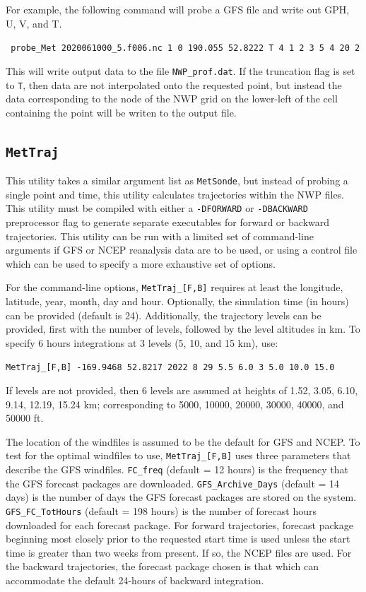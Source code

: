 \documentclass[11pt]{article}   %
\begin{document}
For example, the following command will probe a GFS file and write out
GPH, U, V, and T.

\verb| probe_Met 2020061000_5.f006.nc 1 0 190.055 52.8222 T 4 1 2 3 5 4 20 2 |

This will write output data to the file \texttt{NWP\_prof.dat}.
If the truncation flag is set to \texttt{T}, then data are not interpolated onto
the requested point, but instead the data corresponding to the node of the NWP
grid on the lower-left of the cell containing the point will be writen to the output file.

\subsection{\texttt{MetTraj}}

This utility takes a similar argument list as \texttt{MetSonde}, but instead of
probing a single point and time, this utility calculates trajectories within
the NWP files.
This utility must be compiled with either a \texttt{-DFORWARD} or \texttt{-DBACKWARD}
preprocessor flag to generate separate executables for forward or backward trajectories.
This utility can be run with a limited set of command-line arguments if GFS or NCEP
reanalysis data are to be used, or using a control file which can be used to specify
a more exhaustive set of options.

For the command-line options, \texttt{MetTraj\_[F,B]} requires at least the longitude,
latitude, year, month, day and hour.  Optionally, the simulation time (in hours) can
be provided (default is 24).  Additionally, the trajectory levels can be provided,
first with the number of
levels, followed by the level altitudes in km.  To specify 6 hours
integrations at 3 levels (5, 10, and 15 km), use:

\verb|MetTraj_[F,B] -169.9468 52.8217 2022 8 29 5.5 6.0 3 5.0 10.0 15.0 |

If levels are not provided, then 6 levels are assumed at heights of 1.52,
3.05, 6.10, 9.14, 12.19, 15.24 km; corresponding to 5000, 10000, 20000, 30000,
40000, and 50000 ft.

The location of the windfiles is assumed to be the default for GFS and NCEP.
To test for the optimal windfiles to use, \texttt{MetTraj\_[F,B]} uses three
parameters that describe the GFS windfiles.
\texttt{FC\_freq} (default = 12 hours) is the frequency that the GFS forecast
packages are downloaded.  
\texttt{GFS\_Archive\_Days} (default = 14 days) is the number of days the GFS
forecast packages are stored on the system.
\texttt{GFS\_FC\_TotHours} (default = 198 hours) is the number of forecast hours
downloaded for each forecast package.
For  forward trajectories, forecast package beginning most closely prior to the requested
start time is used unless the start time is greater than two weeks from present.  If
so, the NCEP files are used.  For the backward trajectories, the forecast package
chosen is that which can accommodate the default 24-hours of backward integration.
\end{document}
